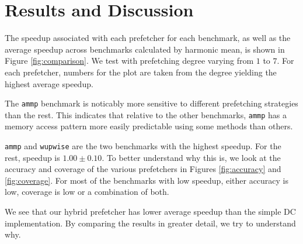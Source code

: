 \section{Results and Discussion}
\label{sec:results-and-discussion}

The speedup associated with each prefetcher for each benchmark, as
well as the average speedup across benchmarks calculated by harmonic
mean, is shown in Figure \ref{fig:comparison}. We test with
prefetching degree varying from $1$ to $7$. For each prefetcher,
numbers for the plot are taken from the degree yielding the highest
average speedup.

The \texttt{ammp} benchmark is noticably more sensitive to different
prefetching strategies than the rest. This indicates that relative to
the other benchmarks, \texttt{ammp} has a memory access pattern more
easily predictable using some methods than others.

\texttt{ammp} and \texttt{wupwise} are the two benchmarks with the
highest speedup.  For the rest, speedup is $1.00\pm0.10$. To better
understand why this is, we look at the accuracy and coverage of the
various prefetchers in Figures \ref{fig:accuracy} and
\ref{fig:coverage}. For most of the benchmarks with low
speedup, either accuracy is low, coverage is low or a combination of
both.

We see that our hybrid prefetcher has lower average speedup than the
simple DC implementation.  By comparing the results in greater detail,
we try to understand why.

